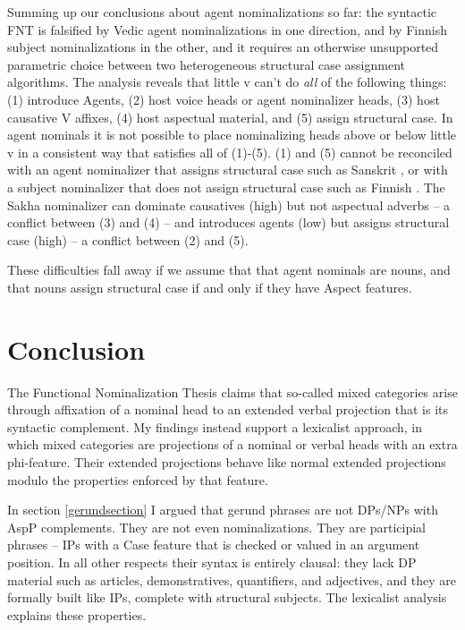 \documentclass[output=paper,
modfonts
]{LSP/langsci}
\def\urf#1{$^{\textrm{\scriptsize{#1}}}$}
\begin{document}
Summing up our conclusions about agent nominalizations so far:  the syntactic FNT is falsified
by Vedic agent nominalizations in one direction, and by Finnish subject nominalizations in the
other, and it requires an otherwise unsupported parametric choice between two heterogeneous
structural case assignment algorithms.  The analysis reveals that little v can't do
\textit{all} of the following things: (1) introduce Agents, (2) host voice heads or agent
nominalizer heads, (3) host causative V affixes, (4) host aspectual material, and (5) assign
structural case.  In agent nominals it is not possible to place nominalizing heads above or
below little v in a consistent way that satisfies all of (1)-(5).  (1) and (5) cannot be
reconciled with an agent nominalizer that assigns structural case such as Sanskrit
\form{′-tar-\urf{V}}, or with a subject nominalizer that does not assign structural case such
as Finnish .  The Sakha nominalizer  can dominate causatives (high)
but not aspectual adverbs – a conflict between (3) and (4) – and introduces agents (low) but
assigns structural case (high) – a conflict between (2) and (5).

These difficulties fall away if we assume that that agent nominals are nouns, and that nouns assign
structural case if and only if they have Aspect features. 


\section{Conclusion}

The Functional Nominalization Thesis claims that so-called mixed categories arise through
affixation of a nominal head to an extended verbal projection that is its syntactic complement.
My findings instead support a lexicalist approach, in which mixed categories are projections of
a nominal or verbal heads with an extra phi-feature.  Their extended projections behave like
normal extended projections modulo the properties enforced by that feature.

In section \ref{gerundsection} I argued that gerund phrases are not DPs/NPs with AspP complements.
They are not even nominalizations.  They are participial phrases – IPs with a Case feature that
is checked or valued in an argument position.  In all other respects their syntax is entirely clausal:
they lack DP material such as articles, demonstratives, quantifiers, and adjectives, and they
are formally built like IPs, complete with structural subjects.  The lexicalist analysis explains 
these properties.
\end{document}
